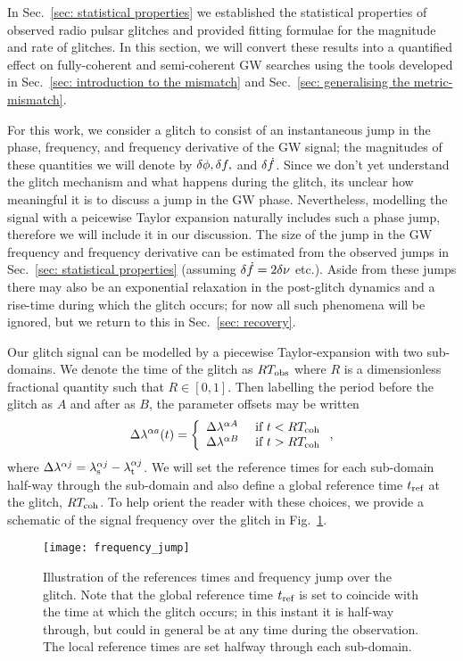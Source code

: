 \documentclass[../full_thesis/full_thesis.tex]{subfiles}
\begin{document}
In Sec.~\ref{sec: statistical properties} we established the statistical
properties of observed radio pulsar glitches and provided fitting formulae for the
magnitude and rate of glitches. In this section, we will convert these
results into a quantified effect on fully-coherent and semi-coherent
GW searches using the tools developed in Sec.~\ref{sec: introduction to the
mismatch} and Sec.~\ref{sec: generalising the metric-mismatch}.

For this work, we consider a glitch to consist of an instantaneous jump in the
phase, frequency, and frequency derivative of the GW signal; the magnitudes of
these quantities we will denote by $\delta\phi, \delta f,$ and
$\delta\dot{f}$.  Since we don't yet understand the glitch mechanism and what
happens during the glitch, its unclear how meaningful it is to discuss a jump
in the GW phase.  Nevertheless, modelling the signal with a peicewise Taylor
expansion naturally includes such a phase jump, therefore we will include it in
our discussion.  The size of the jump in the GW frequency and frequency
derivative can be estimated from the observed jumps in Sec.~\ref{sec:
statistical properties} (assuming $\delta\dot{f} = 2\delta\nu$ etc.). Aside
from these jumps there may also be an exponential relaxation in the post-glitch
dynamics and a rise-time during which the glitch occurs; for now all such
phenomena will be ignored, but we return to this in Sec.~\ref{sec: recovery}.

Our glitch signal can be modelled by a piecewise Taylor-expansion with two
sub-domains. We denote the time of the glitch as $RT_{\mathrm{obs}}$ where $R$
is a dimensionless fractional quantity such that $R\in[0, 1]$.
Then labelling the period before the glitch as $A$ and after as
$B$, the parameter offsets may be written
\begin{align}
\Delta\lambda^{\alpha a}(t) = \left\{
\begin{array}{lc}
\Delta\lambda^{\alpha A} & \textrm{ if } t < RT_{\mathrm{coh}}\\
\Delta\lambda^{\alpha B} & \textrm{ if } t > RT_{\mathrm{coh}}
\end{array}
\right.,
\label{eqn: delta lambda alpha glitch}
\end{align}
where $\Delta\lambda^{\alpha j} = {\lambda}_\textrm{s}^{\alpha j} - {\lambda}_\textrm{t}^{\alpha j}$. We will set the
reference times for each sub-domain half-way through the sub-domain and also define a global
reference time $t_{\textrm{ref}}$ at the glitch, $RT_{\mathrm{coh}}$. To help orient the reader with
these choices, we provide a schematic of the signal frequency over the glitch
in Fig.~\ref{fig: frequency jump}.
\begin{figure}[htb]
\centering
\texttt{[image: frequency\_jump]}
\caption{Illustration of the references times and frequency jump over the glitch.
Note that the global reference time $t_{\textrm{ref}}$ is set to coincide with the time
at which the glitch occurs; in this instant it is half-way through, but could
in general be at any time during the observation. The local reference times are
set halfway through each sub-domain.}
\label{fig: frequency jump}
\end{figure}
\end{document}
